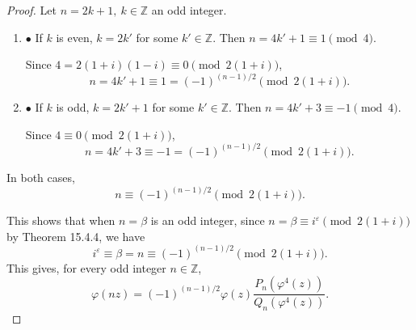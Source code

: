 \documentclass[11pt,a4paper]{article}
\newcommand{\be} {\begin{enumerate}}
\newcommand{\ee} {\end{enumerate}}
\newcommand{\Z}{\mathbb{Z}}
\begin{document}
\begin{proof} 
Let $n = 2k+1,\ k \in \Z$ an odd integer.
\be
\item[$\bullet$] If $k$ is even, $k = 2k'$ for some $k'\in \Z$. Then $n = 4k'+1 \equiv 1 \pmod 4$.

Since $4 = 2(1+i)(1-i) \equiv 0 \pmod {2(1+i)}$, $$n = 4k'+1 \equiv 1 = (-1)^{(n-1)/2} \pmod{2(1+i)}.$$
\item[$\bullet$]If $k$ is odd, $k = 2k'+1$ for some $k'\in \Z$. Then $n = 4k'+ 3 \equiv -1 \pmod 4$.

Since $4 \equiv 0 \pmod {2(1+i)}$,
$$n = 4k'+3 \equiv -1 = (-1)^{(n-1)/2} \pmod {2(1+i)}.$$
\ee
In both cases, 
$$n \equiv (-1)^{(n-1)/2} \pmod {2(1+i)}.$$

\bigskip

This shows that when $n = \beta$ is an odd integer, since $n = \beta \equiv i^\varepsilon \pmod {2(1+i)}$ by Theorem 15.4.4, we have
$$i^\varepsilon \equiv \beta = n \equiv (-1)^{(n-1)/2} \pmod {2(1+i)}.$$
This gives, for every odd integer $n \in \Z$,
$$\varphi(nz) = (-1)^{(n-1)/2} \varphi(z) \frac{P_n\left(\varphi^4(z)\right)}{Q_n\left(\varphi^4(z)\right)}.$$
\end{proof}
\end{document}

